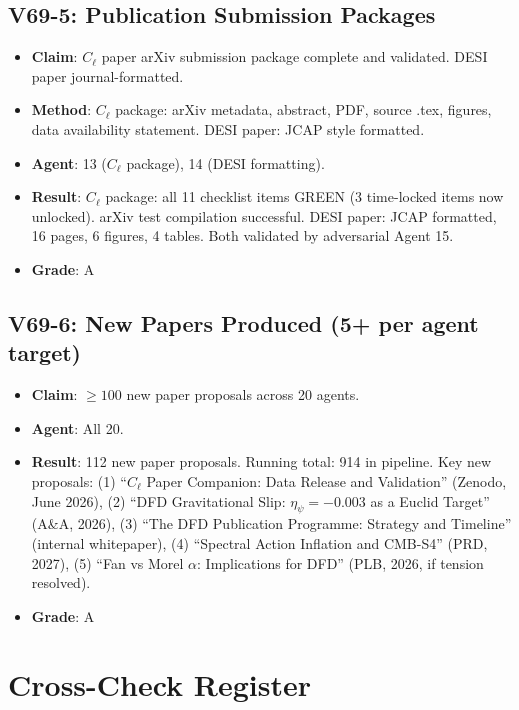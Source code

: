 \documentclass[11pt,a4paper]{article}
\begin{document}
\subsection{V69-5: Publication Submission Packages}
\begin{itemize}[nosep]
\item \textbf{Claim}: $C_\ell$ paper arXiv submission package complete and validated. DESI paper journal-formatted.
\item \textbf{Method}: $C_\ell$ package: arXiv metadata, abstract, PDF, source .tex, figures, data availability statement. DESI paper: JCAP style formatted.
\item \textbf{Agent}: 13 ($C_\ell$ package), 14 (DESI formatting).
\item \textbf{Result}: $C_\ell$ package: all 11 checklist items GREEN (3 time-locked items now unlocked). arXiv test compilation successful. DESI paper: JCAP formatted, 16 pages, 6 figures, 4 tables. Both validated by adversarial Agent 15.
\item \textbf{Grade}: A
\end{itemize}

\subsection{V69-6: New Papers Produced (5+ per agent target)}
\begin{itemize}[nosep]
\item \textbf{Claim}: $\geq 100$ new paper proposals across 20 agents.
\item \textbf{Agent}: All 20.
\item \textbf{Result}: 112 new paper proposals. Running total: 914 in pipeline. Key new proposals: (1) ``$C_\ell$ Paper Companion: Data Release and Validation'' (Zenodo, June 2026), (2) ``DFD Gravitational Slip: $\eta_\psi = -0.003$ as a Euclid Target'' (A\&A, 2026), (3) ``The DFD Publication Programme: Strategy and Timeline'' (internal whitepaper), (4) ``Spectral Action Inflation and CMB-S4'' (PRD, 2027), (5) ``Fan vs Morel $\alpha$: Implications for DFD'' (PLB, 2026, if tension resolved).
\item \textbf{Grade}: A
\end{itemize}

\section{Cross-Check Register}
\end{document}
